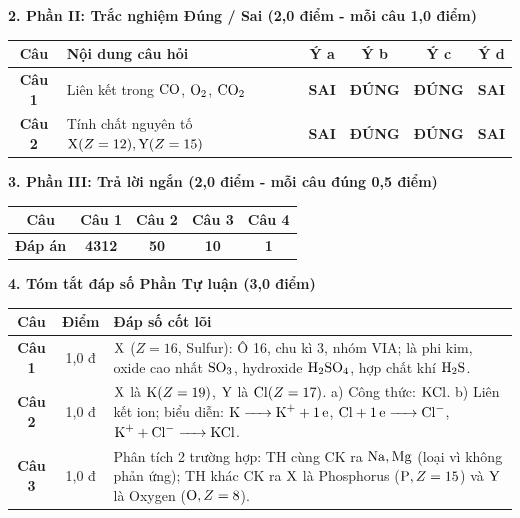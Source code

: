 \documentclass[11pt,a4paper]{article}
\begin{document}
\vspace{2pt}
\noindent
\textbf{\color{mainGreen}2. Phần II: Trắc nghiệm Đúng / Sai (2,0 điểm - mỗi câu 1,0 điểm)}
\begin{center}
\renewcommand{\arraystretch}{1.2}
\begin{tabular}{|c|l|c|c|c|c|}
\hline
\rowcolor{tableGreen}
\textbf{Câu} & \textbf{Nội dung câu hỏi} & \textbf{Ý a} & \textbf{Ý b} & \textbf{Ý c} & \textbf{Ý d} \\
\hline
\textbf{Câu 1} & Liên kết trong $\ce{CO}$, $\ce{O2}$, $\ce{CO2}$ & \textbf{SAI} & \textbf{\color{hfRed}ĐÚNG} & \textbf{\color{hfRed}ĐÚNG} & \textbf{SAI} \\
\hline
\textbf{Câu 2} & Tính chất nguyên tố $\ce{X}(Z=12), \ce{Y}(Z=15)$ & \textbf{SAI} & \textbf{\color{hfRed}ĐÚNG} & \textbf{\color{hfRed}ĐÚNG} & \textbf{SAI} \\
\hline
\end{tabular}
\end{center}

\vspace{2pt}
\noindent
\textbf{\color{mainGreen}3. Phần III: Trả lời ngắn (2,0 điểm - mỗi câu đúng 0,5 điểm)}
\begin{center}
\renewcommand{\arraystretch}{1.2}
\begin{tabular}{|c|c|c|c|c|}
\hline
\rowcolor{tableGreen}
\textbf{Câu} & \textbf{Câu 1} & \textbf{Câu 2} & \textbf{Câu 3} & \textbf{Câu 4} \\
\hline
\textbf{Đáp án} & \textbf{\color{hfRed}4312} & \textbf{\color{hfRed}50} & \textbf{\color{hfRed}10} & \textbf{\color{hfRed}1} \\
\hline
\end{tabular}
\end{center}

\vspace{2pt}
\noindent
\textbf{\color{mainGreen}4. Tóm tắt đáp số Phần Tự luận (3,0 điểm)}
\begin{center}
\renewcommand{\arraystretch}{1.2}
\begin{tabular}{|c|c|p{11.5cm}|}
\hline
\rowcolor{tableGreen}
\textbf{Câu} & \textbf{Điểm} & \textbf{Đáp số cốt lõi} \\
\hline
\textbf{Câu 1} & 1,0 đ & $\ce{X}$ ($Z=16$, Sulfur): Ô 16, chu kì 3, nhóm VIA; là phi kim, oxide cao nhất $\ce{SO3}$, hydroxide $\ce{H2SO4}$, hợp chất khí $\ce{H2S}$. \\
\hline
\textbf{Câu 2} & 1,0 đ & $\ce{X}$ là $\ce{K} (Z=19)$, $\ce{Y}$ là $\ce{Cl} (Z=17)$. a) Công thức: $\ce{KCl}$. b) Liên kết ion; biểu diễn: $\ce{K -> K+ + 1e}$, $\ce{Cl + 1e -> Cl-}$, $\ce{K+ + Cl- -> KCl}$. \\
\hline
\textbf{Câu 3} & 1,0 đ & Phân tích 2 trường hợp: TH cùng CK ra $\ce{Na, Mg}$ (loại vì không phản ứng); TH khác CK ra $\ce{X}$ là Phosphorus ($\ce{P}, Z=15$) và $\ce{Y}$ là Oxygen ($\ce{O}, Z=8$). \\
\hline
\end{tabular}
\end{center}
\end{document}
